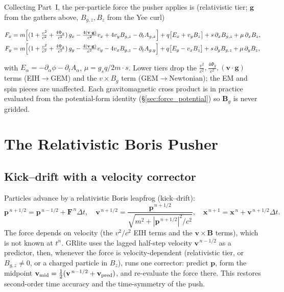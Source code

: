\documentclass[11pt]{article}
\newcommand{\Phig}{\Phi_g}                 %
\newcommand{\vv}[1]{\mathbf{#1}}           %
\newcommand{\dt}{\Delta t}                 %
\newcommand{\Bg}{\vv{B}_g}
\begin{document}
Collecting Part~I, the per-particle force the pusher applies is (relativistic
tier; $\vv g$ from the gathers above, $B_{g,z},B_z$ from the Yee curl)
\begin{eqbox}
\begin{align*}
  F_x &= m\Bigl[(1+\tfrac{v^2}{c^2}+\tfrac{4\Phig}{c^2})\,g_x
        - \tfrac{4(\vv v\cdot\vv g)}{c^2}v_x + 4 v_y B_{g,z} - \partial_tA_{g,x}\Bigr]
        + q\bigl[E_x + v_y B_z\bigr] + s\,\partial_x B_{g,z} + \mu\,\partial_x B_z,\\
  F_y &= m\Bigl[(1+\tfrac{v^2}{c^2}+\tfrac{4\Phig}{c^2})\,g_y
        - \tfrac{4(\vv v\cdot\vv g)}{c^2}v_y - 4 v_x B_{g,z} - \partial_tA_{g,y}\Bigr]
        + q\bigl[E_y - v_x B_z\bigr] + s\,\partial_y B_{g,z} + \mu\,\partial_y B_z,
\end{align*}
\end{eqbox}
with $E_\alpha=-\partial_\alpha\phi-\partial_tA_\alpha$, $\mu=g_s q/2m\cdot s$.
Lower tiers drop the $\tfrac{v^2}{c^2},\tfrac{4\Phig}{c^2},(\vv v\cdot\vv g)$
terms (EIH$\to$GEM) and the $v\times B_g$ term (GEM$\to$Newtonian); the
EM and spin pieces are unaffected. Each gravitomagnetic cross product is in
practice evaluated from the potential-form identity (\S\ref{sec:force_potential})
so $\Bg$ is never gridded.

\section{The Relativistic Boris Pusher}
\label{sec:pusher}

\subsection{Kick--drift with a velocity corrector}

Particles advance by a relativistic Boris leapfrog (kick--drift):
\begin{equation}
  \vv p^{\,n+1/2}=\vv p^{\,n-1/2}+\vv F^{\,n}\dt,\quad
  \vv v^{\,n+1/2}=\frac{\vv p^{\,n+1/2}}{\sqrt{m^2+|\vv p^{\,n+1/2}|^2/c^2}},\quad
  \vv x^{\,n+1}=\vv x^{\,n}+\vv v^{\,n+1/2}\dt.
\end{equation}
The force depends on velocity (the $v^2/c^2$ EIH terms and the $\vv v\times\vv B$
terms), which is not known at $t^n$. GRlite uses the lagged half-step velocity
$\vv v^{\,n-1/2}$ as a predictor, then, whenever the force is velocity-dependent
(relativistic tier, or $B_{g,z}\neq0$, or a charged particle in $B_z$), runs one
corrector: predict $\vv p$, form the midpoint $\vv v_{\rm mid}=\tfrac12(\vv
v^{\,n-1/2}+\vv v_{\rm pred})$, and re-evaluate the force there. This restores
second-order time accuracy and the time-symmetry of the push.
\end{document}
